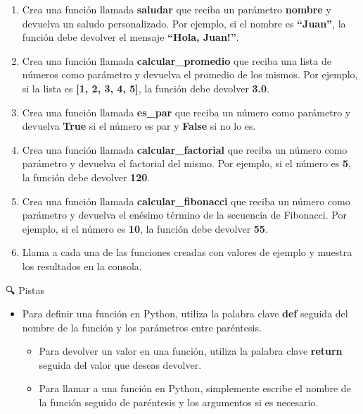 \documentclass[
  a4paper,
  DIV=11,
  numbers=noendperiod,
  onepage,
  openany]{scrreprt}
\providecommand{\tightlist}{%
  \setlength{\itemsep}{0pt}\setlength{\parskip}{0pt}}\usepackage{longtable,booktabs,array}
\begin{document}
\begin{enumerate}
\def\labelenumi{\arabic{enumi}.}
\item
  Crea una función llamada \textbf{saludar} que reciba un parámetro
  \textbf{nombre} y devuelva un saludo personalizado. Por ejemplo, si el
  nombre es \textbf{``Juan''}, la función debe devolver el mensaje
  \textbf{``Hola, Juan!''}.
\item
  Crea una función llamada \textbf{calcular\_promedio} que reciba una
  lista de números como parámetro y devuelva el promedio de los mismos.
  Por ejemplo, si la lista es \textbf{{[}1, 2, 3, 4, 5{]}}, la función
  debe devolver \textbf{3.0}.
\item
  Crea una función llamada \textbf{es\_par} que reciba un número como
  parámetro y devuelva \textbf{True} si el número es par y
  \textbf{False} si no lo es.
\item
  Crea una función llamada \textbf{calcular\_factorial} que reciba un
  número como parámetro y devuelva el factorial del mismo. Por ejemplo,
  si el número es \textbf{5}, la función debe devolver \textbf{120}.
\item
  Crea una función llamada \textbf{calcular\_fibonacci} que reciba un
  número como parámetro y devuelva el enésimo término de la secuencia de
  Fibonacci. Por ejemplo, si el número es \textbf{10}, la función debe
  devolver \textbf{55}.
\item
  Llama a cada una de las funciones creadas con valores de ejemplo y
  muestra los resultados en la consola.
\end{enumerate}

🔍 Pistas

\begin{itemize}
\tightlist
\item
  Para definir una función en Python, utiliza la palabra clave
  \textbf{def} seguida del nombre de la función y los parámetros entre
  paréntesis.

  \begin{itemize}
  \tightlist
  \item
    Para devolver un valor en una función, utiliza la palabra clave
    \textbf{return} seguida del valor que deseas devolver.
  \item
    Para llamar a una función en Python, simplemente escribe el nombre
    de la función seguido de paréntesis y los argumentos si es
    necesario.
  \end{itemize}
\end{itemize}
\end{document}
